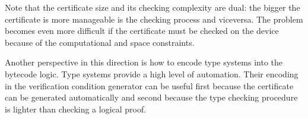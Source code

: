 Note that the certificate size and its checking complexity are dual: the bigger the certificate is more manageable is the checking process and viceversa. 
The problem becomes even more difficult if the certificate must be checked on the device because of the computational and space constraints.
 


  
%  
% 
%        
%     



Another perspective in this direction is how   to encode type systems into the bytecode logic. 
Type systems provide a high level of automation. 
Their encoding in the verification condition generator can be useful first because the certificate can be generated automatically and
second because the type checking procedure is lighter than checking a logical proof.

